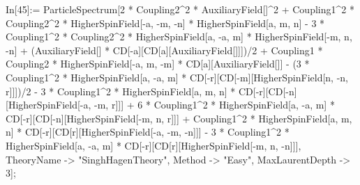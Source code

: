 In[45]:= ParticleSpectrum[2 * Coupling2^2 * AuxiliaryField[]^2 + Coupling1^2 * Coupling2^2 * HigherSpinField[-a, -m, -n] * HigherSpinField[a, m, n] - 3 * Coupling1^2 * Coupling2^2 * HigherSpinField[a, -a, m] * HigherSpinField[-m, n, -n] + (AuxiliaryField[] * CD[-a][CD[a][AuxiliaryField[]]])/2 + Coupling1 * Coupling2 * HigherSpinField[-a, m, -m] * CD[a][AuxiliaryField[]] - (3 * Coupling1^2 * HigherSpinField[a, -a, m] * CD[-r][CD[-m][HigherSpinField[n, -n, r]]])/2 - 3 * Coupling1^2 * HigherSpinField[a, m, n] * CD[-r][CD[-n][HigherSpinField[-a, -m, r]]] + 6 * Coupling1^2 * HigherSpinField[a, -a, m] * CD[-r][CD[-n][HigherSpinField[-m, n, r]]] + Coupling1^2 * HigherSpinField[a, m, n] * CD[-r][CD[r][HigherSpinField[-a, -m, -n]]] - 3 * Coupling1^2 * HigherSpinField[a, -a, m] * CD[-r][CD[r][HigherSpinField[-m, n, -n]]], TheoryName -> "SinghHagenTheory", Method -> "Easy", MaxLaurentDepth -> 3]; 